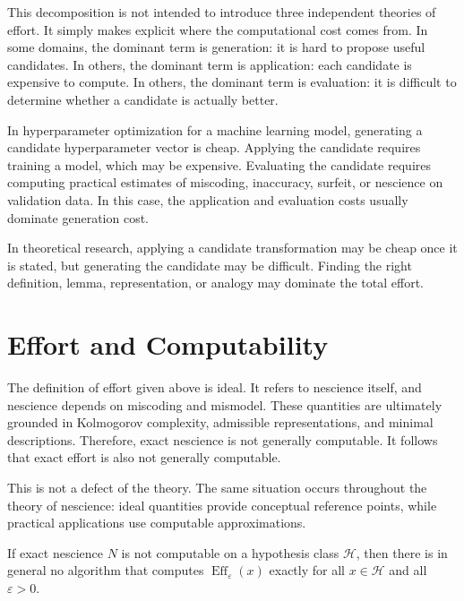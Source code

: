 This decomposition is not intended to introduce three independent theories of effort. It simply makes explicit where the computational cost comes from. In some domains, the dominant term is generation: it is hard to propose useful candidates. In others, the dominant term is application: each candidate is expensive to compute. In others, the dominant term is evaluation: it is difficult to determine whether a candidate is actually better.

\begin{example}
In hyperparameter optimization for a machine learning model, generating a candidate hyperparameter vector is cheap. Applying the candidate requires training a model, which may be expensive. Evaluating the candidate requires computing practical estimates of miscoding, inaccuracy, surfeit, or nescience on validation data. In this case, the application and evaluation costs usually dominate generation cost.
\end{example}

\begin{example}
In theoretical research, applying a candidate transformation may be cheap once it is stated, but generating the candidate may be difficult. Finding the right definition, lemma, representation, or analogy may dominate the total effort.
\end{example}

\section{Effort and Computability}
\label{sec:effort_and_computability}

The definition of effort given above is ideal. It refers to nescience itself, and nescience depends on miscoding and mismodel. These quantities are ultimately grounded in Kolmogorov complexity, admissible representations, and minimal descriptions. Therefore, exact nescience is not generally computable. It follows that exact effort is also not generally computable.

This is not a defect of the theory. The same situation occurs throughout the theory of nescience: ideal quantities provide conceptual reference points, while practical applications use computable approximations.

\begin{proposition}
If exact nescience \(N\) is not computable on a hypothesis class \(\mathcal{H}\), then there is in general no algorithm that computes \(\operatorname{Eff}_{\varepsilon}(x)\) exactly for all \(x\in\mathcal{H}\) and all \(\varepsilon>0\).
\end{proposition}

